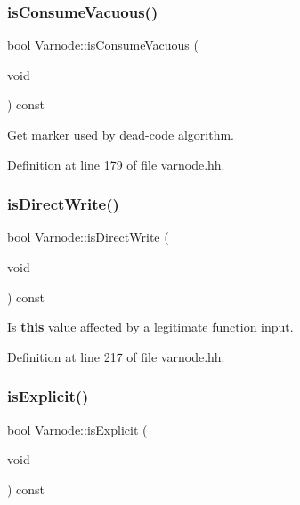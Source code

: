 \subsubsection{\texorpdfstring{isConsumeVacuous()}{isConsumeVacuous()}}
{\footnotesize\ttfamily bool Varnode\+::is\+Consume\+Vacuous (\begin{DoxyParamCaption}\item[{void}]{ }\end{DoxyParamCaption}) const\hspace{0.3cm}{\ttfamily [inline]}}



Get marker used by dead-\/code algorithm. 



Definition at line 179 of file varnode.\+hh.

\mbox{\label{class_varnode_a9d5173dcb168690858927259268ec016}} 
\subsubsection{\texorpdfstring{isDirectWrite()}{isDirectWrite()}}
{\footnotesize\ttfamily bool Varnode\+::is\+Direct\+Write (\begin{DoxyParamCaption}\item[{void}]{ }\end{DoxyParamCaption}) const\hspace{0.3cm}{\ttfamily [inline]}}



Is {\bfseries{this}} value affected by a legitimate function input. 



Definition at line 217 of file varnode.\+hh.

\mbox{\label{class_varnode_ae866a00302146a1f7d50352bdaa145d8}} 
\subsubsection{\texorpdfstring{isExplicit()}{isExplicit()}}
{\footnotesize\ttfamily bool Varnode\+::is\+Explicit (\begin{DoxyParamCaption}\item[{void}]{ }\end{DoxyParamCaption}) const\hspace{0.3cm}{\ttfamily [inline]}}



